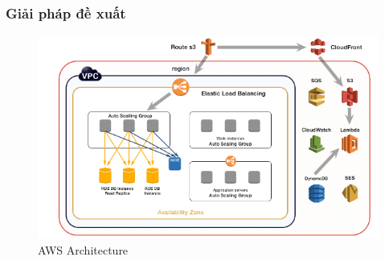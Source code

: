 \subsubsection{Giải pháp đề xuất}
\begin{figure}[H]
    \begin{center}
    \includegraphics[scale=1]{images/hieu/chap-2/aws-architecture.png}
    \vspace*{5mm}
    \caption{AWS Architecture}
    \end{center}
\end{figure} 
